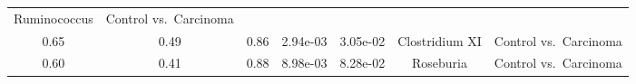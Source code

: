 \documentclass[12pt,]{article}
\begin{document}
\begin{longtable}[]{@{}ccccccc@{}}
\begin{minipage}[t]{0.23\columnwidth}
Ruminococcus\strut
\end{minipage} & \begin{minipage}[t]{0.16\columnwidth}\centering\strut
Control vs.~Carcinoma\strut
\end{minipage}\tabularnewline
\begin{minipage}[t]{0.06\columnwidth}\centering\strut
0.65\strut
\end{minipage} & \begin{minipage}[t]{0.10\columnwidth}\centering\strut
0.49\strut
\end{minipage} & \begin{minipage}[t]{0.10\columnwidth}\centering\strut
0.86\strut
\end{minipage} & \begin{minipage}[t]{0.08\columnwidth}\centering\strut
2.94e-03\strut
\end{minipage} & \begin{minipage}[t]{0.08\columnwidth}\centering\strut
3.05e-02\strut
\end{minipage} & \begin{minipage}[t]{0.23\columnwidth}\centering\strut
Clostridium XI\strut
\end{minipage} & \begin{minipage}[t]{0.16\columnwidth}\centering\strut
Control vs.~Carcinoma\strut
\end{minipage}\tabularnewline
\begin{minipage}[t]{0.06\columnwidth}\centering\strut
0.60\strut
\end{minipage} & \begin{minipage}[t]{0.10\columnwidth}\centering\strut
0.41\strut
\end{minipage} & \begin{minipage}[t]{0.10\columnwidth}\centering\strut
0.88\strut
\end{minipage} & \begin{minipage}[t]{0.08\columnwidth}\centering\strut
8.98e-03\strut
\end{minipage} & \begin{minipage}[t]{0.08\columnwidth}\centering\strut
8.28e-02\strut
\end{minipage} & \begin{minipage}[t]{0.23\columnwidth}\centering\strut
Roseburia\strut
\end{minipage} & \begin{minipage}[t]{0.16\columnwidth}\centering\strut
Control vs.~Carcinoma\strut
\end{minipage}\tabularnewline

\end{longtable}
\end{document}
